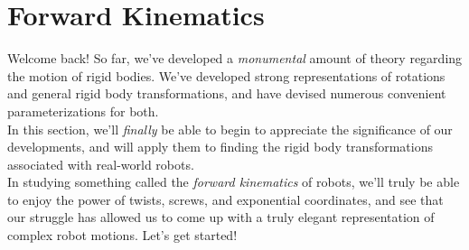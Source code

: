 \documentclass[oneside]{book}
\begin{document}
\section{Forward Kinematics}
Welcome back! So far, we've developed a \textit{monumental} amount of theory regarding the motion of rigid bodies. We've developed strong representations of rotations and general rigid body transformations, and have devised numerous convenient parameterizations for both.\\
In this section, we'll \textit{finally} be able to begin to appreciate the significance of our developments, and will apply them to finding the rigid body transformations associated with real-world robots.\\
In studying something called the \textit{forward kinematics} of robots, we'll truly be able to enjoy the power of twists, screws, and exponential coordinates, and see that our struggle has allowed us to come up with a truly elegant representation of complex robot motions. Let's get started!
\end{document}
